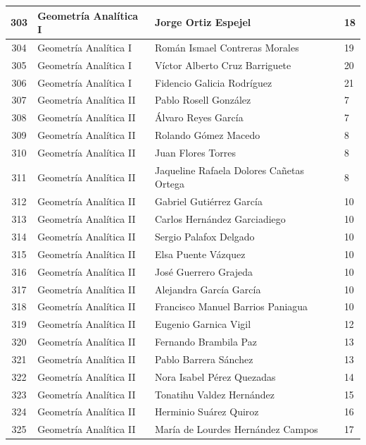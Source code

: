 {\begin{longtable}{|c|p{6.5cm}|p{5cm}|p{1.5cm}|}
  303 & Geometría Analítica I & Jorge Ortiz Espejel & 18 \\ \hline
  304 & Geometría Analítica I & Román Ismael Contreras Morales & 19 \\ \hline
  305 & Geometría Analítica I & Víctor Alberto Cruz Barriguete & 20 \\ \hline
  306 & Geometría Analítica I & Fidencio Galicia Rodríguez & 21 \\ \hline
  307 & Geometría Analítica II & Pablo Rosell González & 7 \\ \hline
  308 & Geometría Analítica II & Álvaro Reyes García & 7 \\ \hline
  309 & Geometría Analítica II & Rolando Gómez Macedo & 8 \\ \hline
  310 & Geometría Analítica II & Juan Flores Torres & 8 \\ \hline
  311 & Geometría Analítica II & Jaqueline Rafaela Dolores Cañetas Ortega & 8 \\ \hline
  312 & Geometría Analítica II & Gabriel Gutiérrez García & 10 \\ \hline
  313 & Geometría Analítica II & Carlos Hernández Garciadiego & 10 \\ \hline
  314 & Geometría Analítica II & Sergio Palafox Delgado & 10 \\ \hline
  315 & Geometría Analítica II & Elsa Puente Vázquez & 10 \\ \hline
  316 & Geometría Analítica II & José Guerrero Grajeda & 10 \\ \hline
  317 & Geometría Analítica II & Alejandra García García & 10 \\ \hline
  318 & Geometría Analítica II & Francisco Manuel Barrios Paniagua & 10 \\ \hline
  319 & Geometría Analítica II & Eugenio Garnica Vigil & 12 \\ \hline
  320 & Geometría Analítica II & Fernando Brambila Paz & 13 \\ \hline
  321 & Geometría Analítica II & Pablo Barrera Sánchez & 13 \\ \hline
  322 & Geometría Analítica II & Nora Isabel Pérez Quezadas & 14 \\ \hline
  323 & Geometría Analítica II & Tonatihu Valdez Hernández & 15 \\ \hline
  324 & Geometría Analítica II & Herminio Suárez Quiroz & 16 \\ \hline
  325 & Geometría Analítica II & María de Lourdes Hernández Campos & 17 \\ \hline

\end{longtable}}
